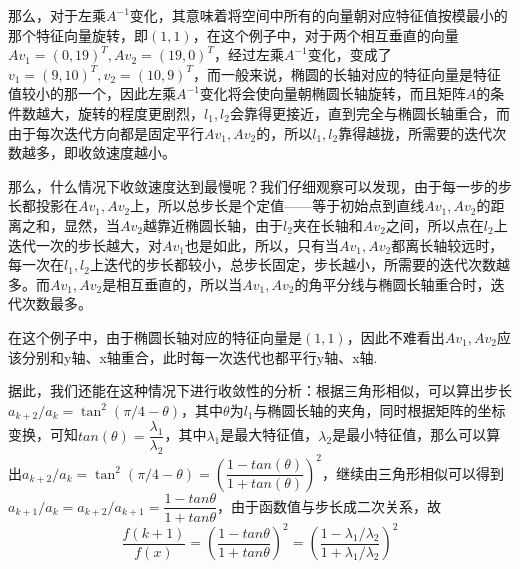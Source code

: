 那么，对于左乘$A^{-1}$变化，其意味着将空间中所有的向量朝对应特征值按模最小的那个特征向量旋转，即$(1,1)$，在这个例子中，对于两个相互垂直的向量$Av_1=(0,19)^T,Av_2=(19,0)^T$，经过左乘$A^{-1}$变化，变成了$v_1=(9,10)^T,v_2=(10,9)^T$，而一般来说，椭圆的长轴对应的特征向量是特征值较小的那一个，因此左乘$A^{-1}$变化将会使向量朝椭圆长轴旋转，而且矩阵$A$的条件数越大，旋转的程度更剧烈，$l_1,l_2$会靠得更接近，直到完全与椭圆长轴重合，而由于每次迭代方向都是固定平行$Av_1,Av_2$的，所以$l_1,l_2$靠得越拢，所需要的迭代次数越多，即收敛速度越小。

那么，什么情况下收敛速度达到最慢呢？我们仔细观察可以发现，由于每一步的步长都投影在$Av_1,Av_2$上，所以总步长是个定值——等于初始点到直线$Av_1,Av_2$的距离之和，显然，当$Av_2$越靠近椭圆长轴，由于$l_2$夹在长轴和$Av_2$之间，所以点在$l_2$上迭代一次的步长越大，对$Av_1$也是如此，所以，只有当$Av_1,Av_2$都离长轴较远时，每一次在$l_1,l_2$上迭代的步长都较小，总步长固定，步长越小，所需要的迭代次数越多。而$Av_1,Av_2$是相互垂直的，所以当$Av_1,Av_2$的角平分线与椭圆长轴重合时，迭代次数最多。

在这个例子中，由于椭圆长轴对应的特征向量是$(1,1)$，因此不难看出$Av_1,Av_2$应该分别和y轴、x轴重合，此时每一次迭代也都平行y轴、x轴.

据此，我们还能在这种情况下进行收敛性的分析：根据三角形相似，可以算出步长$a_{k+2}/a_k=\tan^2(\pi/4-\theta)$，其中$\theta$为$l_1$与椭圆长轴的夹角，同时根据矩阵的坐标变换，可知$tan(\theta)=\dfrac{\lambda_1}{\lambda_2}$，其中$\lambda_1$是最大特征值，$\lambda_2$是最小特征值，那么可以算出$a_{k+2}/a_k=\tan^2(\pi/4-\theta)=(\dfrac{1-tan(\theta)}{1+tan(\theta)})^2$，继续由三角形相似可以得到$a_{k+1}/a_k=a_{k+2}/a_{k+1}=\dfrac{1-tan\theta}{1+tan\theta}$，由于函数值与步长成二次关系，故\[\dfrac{f(k+1)}{f(x)}=(\dfrac{1-tan\theta}{1+tan\theta})^2=(\dfrac{1-\lambda_1/\lambda_2}{1+\lambda_1/\lambda_2})^2\]



